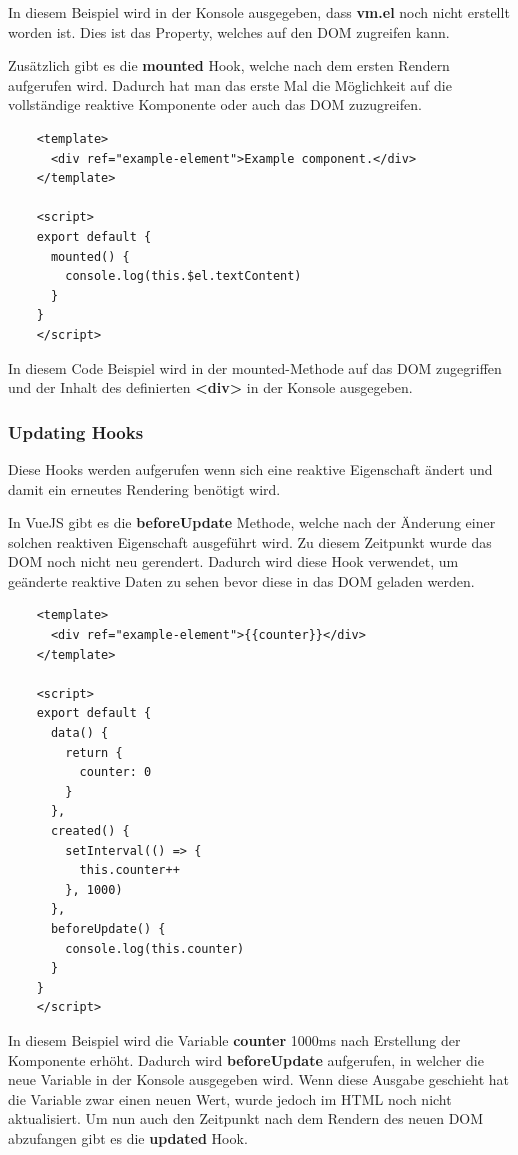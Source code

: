 In diesem Beispiel wird in der Konsole ausgegeben, dass \textbf{vm.el} noch nicht erstellt worden ist. Dies ist das Property, welches auf den DOM zugreifen kann. 

Zusätzlich gibt es die \textbf{mounted} Hook, welche nach dem ersten Rendern aufgerufen wird. Dadurch hat man das erste Mal die Möglichkeit auf die vollständige reaktive Komponente oder auch das DOM zuzugreifen.

\begin{lstlisting}
    <template>
      <div ref="example-element">Example component.</div>
    </template>
    
    <script>
    export default {
      mounted() {
        console.log(this.$el.textContent)
      }
    }
    </script>
\end{lstlisting}

In diesem Code Beispiel wird in der mounted-Methode auf das DOM zugegriffen und der Inhalt des definierten \textbf{<div>} in der Konsole ausgegeben.
\cite{frontend_web_vuejs_lifecycle}

\subsubsection{Updating Hooks}
Diese Hooks werden aufgerufen wenn sich eine reaktive Eigenschaft ändert und damit ein erneutes Rendering benötigt wird.

In VueJS gibt es die \textbf{beforeUpdate} Methode, welche nach der Änderung einer solchen reaktiven Eigenschaft ausgeführt wird. Zu diesem Zeitpunkt wurde das DOM noch nicht neu gerendert. Dadurch wird diese Hook verwendet, um geänderte reaktive Daten zu sehen bevor diese in das DOM geladen werden.

\begin{lstlisting}
    <template>
      <div ref="example-element">{{counter}}</div>
    </template>
    
    <script>
    export default {
      data() {
        return {
          counter: 0
        }
      },
      created() {
        setInterval(() => {
          this.counter++
        }, 1000)
      },
      beforeUpdate() {
        console.log(this.counter)
      }
    }
    </script>
\end{lstlisting}

In diesem Beispiel wird die Variable \textbf{counter} 1000ms nach Erstellung der Komponente erhöht. Dadurch wird \textbf{beforeUpdate} aufgerufen, in welcher die neue Variable in der Konsole ausgegeben wird. Wenn diese Ausgabe geschieht hat die Variable zwar einen neuen Wert, wurde jedoch im HTML noch nicht aktualisiert.
\newpage
Um nun auch den Zeitpunkt nach dem Rendern des neuen DOM abzufangen gibt es die \textbf{updated} Hook.

